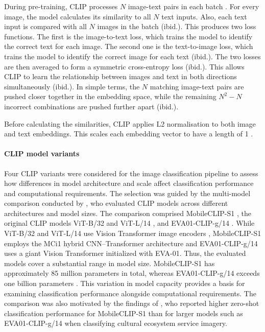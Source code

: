 \documentclass[11pt]{article}
\renewcommand{\_}{\textunderscore\allowbreak{}}
\begin{document}
During pre-training, CLIP processes $N$ image-text pairs in each batch \citep{radford_learning_2021}. For every image, the model calculates its similarity to all $N$ text inputs. Also, each text input is compared with all $N$ images in the batch (ibid.). This produces two loss functions. The first is the image-to-text loss, which trains the model to identify the correct text for each image. The second one is the text-to-image loss, which trains the model to identify the correct image for each text (ibid.). The two losses are then averaged to form a symmetric cross-entropy loss (ibid.). This allows CLIP to learn the relationship between images and text in both directions simultaneously (ibid.). In simple terms, the $N$ matching image-text pairs are pushed closer together in the embedding space, while the remaining $N^2 - N$ incorrect combinations are pushed further apart (ibid.).

Before calculating the similarities, CLIP applies L2 normalisation to both image and text embeddings. This scales each embedding vector to have a length of 1 \citep{radford_learning_2021}.

\paragraph{CLIP model variants}


Four CLIP variants were considered for the image classification pipeline to assess how differences in model architecture and scale affect classification performance and computational requirements. The selection was guided by the multi-model comparison conducted by \citet{liao_mapping_2025}, who evaluated CLIP models across different architectures and model sizes. The comparison comprised MobileCLIP-S1 \citep{vasu_mobileclip_2024}, the original CLIP models ViT-B/32 and ViT-L/14 \citep{radford_learning_2021}, and EVA01-CLIP-g/14 \citep{sun_eva-clip_2023}. While ViT-B/32 and ViT-L/14 use Vision Transformer image encoders \citep{radford_learning_2021}, MobileCLIP-S1 employs the MCi1 hybrid CNN--Transformer architecture and EVA01-CLIP-g/14 uses a giant Vision Transformer initialized with EVA-01. Thus, the evaluated models cover a substantial range in model size. MobileCLIP-S1 has approximately 85 million parameters in total, whereas EVA01-CLIP-g/14 exceeds one billion parameters \citep{vasu_mobileclip_2024,sun_eva-clip_2023}. This variation in model capacity provides a basis for examining classification performance alongside computational requirements. The comparison was also motivated by the findings of \citet{liao_mapping_2025}, who reported higher zero-shot classification performance for MobileCLIP-S1 than for larger models such as EVA01-CLIP-g/14 when classifying cultural ecosystem service imagery.
\end{document}
